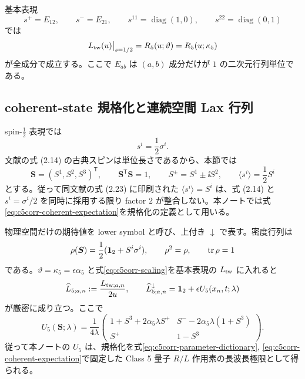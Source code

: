 基本表現
\begin{equation}
s^+=E_{12},\qquad s^-=E_{21},\qquad
s^{11}=\operatorname{diag}(1,0),\qquad
s^{22}=\operatorname{diag}(0,1)
\end{equation}
では
\begin{equation}
L_{\rm tw}(u)\big|_{s=1/2}=R_5(u;\vartheta)=R_5(u;\kappa_5)
\label{eq:c5corr-fundamental-equality}
\end{equation}
が全成分で成立する。ここで $E_{ab}$ は $(a,b)$ 成分だけが $1$ の二次元行列単位である。

\subsection{coherent-state 規格化と連続空間 Lax 行列}

spin-$\tfrac12$ 表現では
\begin{equation}
s^i=\frac12\sigma^i.
\end{equation}
文献\cite{DFN2026}の式 (2.14) の古典スピンは単位長さであるから、本節では
\begin{equation}
\boldsymbol S=(S^1,S^2,S^3)^{\mathsf T},
\qquad \boldsymbol S^{\mathsf T}\boldsymbol S=1,
\qquad S^\pm=S^1\pm\ii S^2,
\qquad
\langle s^i\rangle=\frac12S^i
\label{eq:c5corr-coherent-expectation}
\end{equation}
とする。従って同文献の式 (2.23) に印刷された $\langle s^i\rangle=S^i$ は、式 (2.14) と $s^i=\sigma^i/2$ を同時に採用する限り factor $2$ が整合しない。本ノートでは式\eqref{eq:c5corr-coherent-expectation}を規格化の定義として用いる。

物理空間だけの期待値を lower symbol と呼び、上付き $\downarrow$ で表す。密度行列は
\begin{equation}
\rho(\boldsymbol S)=\frac12(\mathbf1_2+S^i\sigma^i),
\qquad \rho^2=\rho,\qquad \operatorname{tr}\rho=1
\end{equation}
である。$\vartheta=\kappa_5=\epsilon\alpha_5$ と式\eqref{eq:c5corr-scaling}を基本表現の $L_{\rm tw}$ に入れると
\begin{equation}
\widehat L_{5;a,n}:=\frac{L_{{\rm tw};a,n}}{2u},
\qquad
\widehat L_{5;a,n}^{\downarrow}
=\mathbf1_2+\epsilon U_5(x_n,t;\lambda)
\label{eq:c5corr-exact-symbol}
\end{equation}
が厳密に成り立つ。ここで
\begin{equation}
U_5(\boldsymbol S;\lambda)
=\frac1{4\lambda}
\begin{pmatrix}
1+S^3+2\alpha_5\lambda S^+
&S^--2\alpha_5\lambda(1+S^3)\\
S^+&1-S^3
\end{pmatrix}.
\label{eq:c5corr-U}
\end{equation}
従って本ノートの $U_5$ は、規格化を式\eqref{eq:c5corr-parameter-dictionary}, \eqref{eq:c5corr-coherent-expectation}で固定した Class 5 量子 $R/L$ 作用素の長波長極限として得られる。

